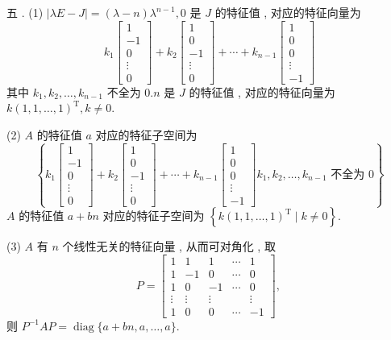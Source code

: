 \documentclass[10pt]{article}
\begin{document}
 五 . (1) $|\lambda E-J|=(\lambda-n) \lambda^{n-1}, 0$  是  $J$  的特征值 ,  对应的特征向量为 
$$
k_{1}\left[\begin{array}{c}
1 \\
-1 \\
0 \\
\vdots \\
0
\end{array}\right]+k_{2}\left[\begin{array}{c}
1 \\
0 \\
-1 \\
\vdots \\
0
\end{array}\right]+\cdots+k_{n-1}\left[\begin{array}{c}
1 \\
0 \\
0 \\
\vdots \\
-1
\end{array}\right]
$$
 其中  $k_{1}, k_{2}, \ldots, k_{n-1}$  不全为  $0 . n$  是  $J$  的特征值 ,  对应的特征向量为  $k(1,1, \ldots, 1)^{\mathrm{T}}, k \neq 0$.

(2) $A$  的特征值  $a$  对应的特征子空间为 
$$
\left\{k_{1}\left[\begin{array}{c}
1 \\
-1 \\
0 \\
\vdots \\
0
\end{array}\right]+k_{2}\left[\begin{array}{c}
1 \\
0 \\
-1 \\
\vdots \\
0
\end{array}\right]+\cdots+k_{n-1}\left[\begin{array}{c}
1 \\
0 \\
0 \\
\vdots \\
-1
\end{array}\right] k_{1}, k_{2}, \ldots, k_{n-1} \text { 不全为 } 0\right\}
$$
$A$  的特征值  $a+b n$  对应的特征子空间为  $\left\{k(1,1, \ldots, 1)^{\mathrm{T}} \mid k \neq 0\right\}$.

(3) $A$  有  $n$  个线性无关的特征向量 ,  从而可对角化 ,  取 
$$
P=\left[\begin{array}{ccccc}
1 & 1 & 1 & \cdots & 1 \\
1 & -1 & 0 & \cdots & 0 \\
1 & 0 & -1 & \cdots & 0 \\
\vdots & \vdots & \vdots & & \vdots \\
1 & 0 & 0 & \cdots & -1
\end{array}\right] \text {, }
$$
 则  $P^{-1} A P=\operatorname{diag}\{a+b n, a, \ldots, a\}$.
\end{document}
